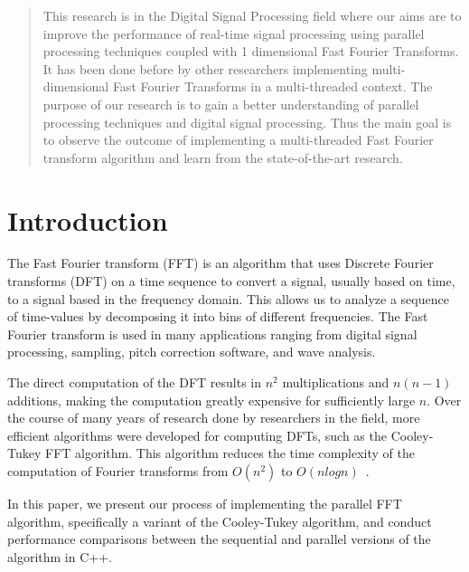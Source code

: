 \documentclass[journal]{IEEEtran}
\begin{document}
\maketitle

\begin{abstract}
This research is in the Digital Signal Processing field 
where our aims are to improve the performance of real-time signal 
processing using parallel processing techniques coupled with 1 
dimensional Fast Fourier Transforms. 
It has been done before by other researchers implementing 
multi-dimensional Fast Fourier Transforms in a multi-threaded context. 
The purpose of our research is to gain a better understanding of 
parallel processing techniques and digital signal processing. 
Thus the main goal is to observe the outcome of implementing a 
multi-threaded Fast Fourier transform algorithm and learn from the 
state-of-the-art research.
\end{abstract}

\section{Introduction}
	\par {The Fast Fourier transform (FFT) is an algorithm that uses Discrete Fourier transforms
	 (DFT) on a time sequence to convert a signal, usually based on time, to a signal based in the
	 frequency domain. This allows us to analyze a sequence of time-values by decomposing it into 
	 bins of different frequencies. The Fast Fourier transform is used in many applications ranging 
	 from digital signal processing, sampling, pitch correction software, and wave analysis.}

	\par {The direct computation of the DFT results in $n^2$ multiplications and $n(n-1)$ additions, 
	making the computation greatly expensive for sufficiently large $n$.  Over the course of many years
	of research done by researchers in the field, more efficient algorithms were developed for computing DFTs,
	such as the Cooley-Tukey FFT algorithm. This algorithm reduces the time complexity of the computation of
	Fourier transforms from $O(n^2)$ to $O(nlogn)$~\cite{Xiang}}.

	\par {In this paper, we present our process of implementing the parallel FFT algorithm, specifically
	a variant of the Cooley-Tukey algorithm, and conduct performance comparisons between the sequential and 
	parallel versions of the algorithm in C++.}
\end{document}
